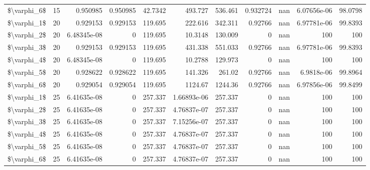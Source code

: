 \begin{tabular}{lrrrrrrrrrr}
 \$\textbackslash{}varphi\_6\$ &  15 & 0.950985    & 0.950985 &     42.7342 &  493.727       &     536.461  &     0.932724 &         nan &   6.07656e-06 &  98.0798      \\
 \$\textbackslash{}varphi\_1\$ &  20 & 0.929153    & 0.929153 &    119.695  &  222.616       &     342.311  &     0.92766  &         nan &   6.97781e-06 &  99.8393      \\
 \$\textbackslash{}varphi\_2\$ &  20 & 6.48345e-08 & 0        &    119.695  &   10.3148      &     130.009  &     0        &         nan & 100           & 100           \\
 \$\textbackslash{}varphi\_3\$ &  20 & 0.929153    & 0.929153 &    119.695  &  431.338       &     551.033  &     0.92766  &         nan &   6.97781e-06 &  99.8393      \\
 \$\textbackslash{}varphi\_4\$ &  20 & 6.48345e-08 & 0        &    119.695  &   10.2788      &     129.973  &     0        &         nan & 100           & 100           \\
 \$\textbackslash{}varphi\_5\$ &  20 & 0.928622    & 0.928622 &    119.695  &  141.326       &     261.02   &     0.92766  &         nan &   6.9818e-06  &  99.8964      \\
 \$\textbackslash{}varphi\_6\$ &  20 & 0.929054    & 0.929054 &    119.695  & 1124.67        &    1244.36   &     0.92766  &         nan &   6.97856e-06 &  99.8499      \\
 \$\textbackslash{}varphi\_1\$ &  25 & 6.41635e-08 & 0        &    257.337  &    1.66893e-06 &     257.337  &     0        &         nan & 100           & 100           \\
 \$\textbackslash{}varphi\_2\$ &  25 & 6.41635e-08 & 0        &    257.337  &    4.76837e-07 &     257.337  &     0        &         nan & 100           & 100           \\
 \$\textbackslash{}varphi\_3\$ &  25 & 6.41635e-08 & 0        &    257.337  &    7.15256e-07 &     257.337  &     0        &         nan & 100           & 100           \\
 \$\textbackslash{}varphi\_4\$ &  25 & 6.41635e-08 & 0        &    257.337  &    4.76837e-07 &     257.337  &     0        &         nan & 100           & 100           \\
 \$\textbackslash{}varphi\_5\$ &  25 & 6.41635e-08 & 0        &    257.337  &    4.76837e-07 &     257.337  &     0        &         nan & 100           & 100           \\
 \$\textbackslash{}varphi\_6\$ &  25 & 6.41635e-08 & 0        &    257.337  &    4.76837e-07 &     257.337  &     0        &         nan & 100           & 100           \\

\end{tabular}

